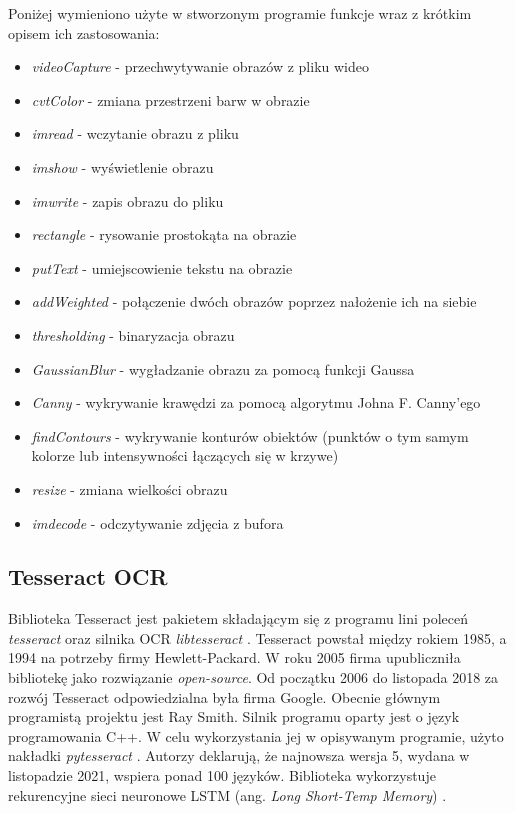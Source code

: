 Poniżej wymieniono użyte w stworzonym programie funkcje wraz z krótkim opisem ich zastosowania:
\begin{itemize}
    \item \textit{videoCapture} - przechwytywanie obrazów z pliku wideo
    \item \textit{cvtColor} - zmiana przestrzeni barw w obrazie
    \item \textit{imread} - wczytanie obrazu z pliku
    \item \textit{imshow} - wyświetlenie obrazu
    \item \textit{imwrite} - zapis obrazu do pliku
    \item \textit{rectangle} - rysowanie prostokąta na obrazie
    \item \textit{putText} - umiejscowienie tekstu na obrazie
    \item \textit{addWeighted} - połączenie dwóch obrazów poprzez nałożenie ich na siebie
    \item \textit{thresholding} - binaryzacja obrazu
    \item \textit{GaussianBlur} - wygładzanie obrazu za pomocą funkcji Gaussa
    \item \textit{Canny} - wykrywanie krawędzi za pomocą algorytmu Johna F. Canny'ego \cite{4767851}
    \item \textit{findContours} - wykrywanie konturów obiektów (punktów o tym samym kolorze lub intensywności łączących się w krzywe)
    \item \textit{resize} - zmiana wielkości obrazu
    \item \textit{imdecode} - odczytywanie zdjęcia z bufora
\end{itemize}

\subsection{Tesseract OCR}
Biblioteka Tesseract jest pakietem składającym się z programu lini poleceń \textit{tesseract} oraz silnika OCR \textit{libtesseract} \cite{tesseract}.
Tesseract powstał między rokiem 1985, a 1994 na potrzeby firmy Hewlett-Packard.
W roku 2005 firma upubliczniła bibliotekę jako rozwiązanie \textit{open-source}.
Od początku 2006 do listopada 2018 za rozwój Tesseract odpowiedzialna była firma Google.
Obecnie głównym programistą projektu jest Ray Smith.
Silnik programu oparty jest o język programowania C++.
W celu wykorzystania jej w opisywanym programie, użyto nakładki \textit{pytesseract} \cite{pytesseract}.
Autorzy deklarują, że najnowsza wersja 5, wydana w listopadzie 2021, wspiera ponad 100 języków.
Biblioteka wykorzystuje rekurencyjne sieci neuronowe LSTM (ang. \textit{Long Short-Temp Memory}) \cite{lstm}.

